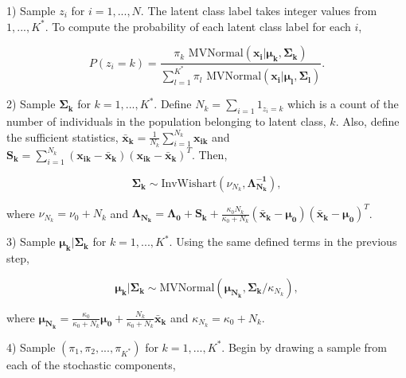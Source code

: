 \documentclass[
  12pt,
]{article}
\begin{document}
\begin{list}{}{}

\item[1)] Sample $z_i$ for $i=1,...,N$. The latent class label takes integer values from $1,...,K^*$.  To compute the probability of each latent class label for each $i$,

\begin{equation}
P(z_i=k) = \frac{\pi_k \text{ MVNormal}(\boldsymbol{x_i}|\boldsymbol{\mu_k},\boldsymbol{\Sigma_k})}{\sum_{l=1}^{K^*}\pi_l \text{ MVNormal}(\boldsymbol{x_i}|\boldsymbol{\mu_l},\boldsymbol{\Sigma_l})}.
\end{equation}

\item[2)] Sample $\boldsymbol{\Sigma_k}$ for $k=1,...,K^*$. Define $N_k=\sum_{i=1}1_{z_i=k}$ which is a count of the number of individuals in the population belonging to latent class, $k$.  Also, define the sufficient statistics, $\boldsymbol{\bar{x}_k}=\frac{1}{N_k}\sum_{i=1}^{N_k}\boldsymbol{x_{ik}}$ and $\boldsymbol{S_k} = \sum_{i=1}^{N_k}(\boldsymbol{x_{ik}}-\boldsymbol{\bar{x}_k})(\boldsymbol{x_{ik}}-\boldsymbol{\bar{x}_k})^T$.  Then,

\begin{equation}
\boldsymbol{\Sigma_k} \sim \text{InvWishart}(\nu_{N_k},\boldsymbol{\Lambda_{N_k}^{-1}}),
\end{equation}

where $\nu_{N_k} = \nu_{0}+N_k$ and $\boldsymbol{\Lambda_{N_k}}=\boldsymbol{\Lambda_{0}}+\boldsymbol{S_k}+\frac{\kappa_{0}N_k}{\kappa_{0}+N_k}(\boldsymbol{\bar{x}_k}-\boldsymbol{\mu_{0}})(\boldsymbol{\bar{x}_k}-\boldsymbol{\mu_{0}})^T$.

\item[3)] Sample $\boldsymbol{\mu_k|\Sigma_k}$ for $k=1,...,K^*$.  Using the same defined terms in the previous step,

\begin{equation}
\boldsymbol{\mu_k}|\boldsymbol{\Sigma_k} \sim \text{MVNormal}(\boldsymbol{\mu_{N_k}},\boldsymbol{\Sigma_k}/\kappa_{N_k} ),
\end{equation}

where $\boldsymbol{\mu_{N_k}}=\frac{\kappa_{0}}{\kappa_{0}+N_k}\boldsymbol{\mu_{0}} + \frac{N_k}{\kappa_{0}+N_k}\boldsymbol{\bar{x}_k} $ and $\kappa_{N_k}=\kappa_{0}+N_k$.

\item[4)] Sample $(\pi_1,\pi_2,...,\pi_{K^*})$ for $k=1,...,K^*$.  Begin by drawing a sample from each of the stochastic components,


\end{list}
\end{document}
